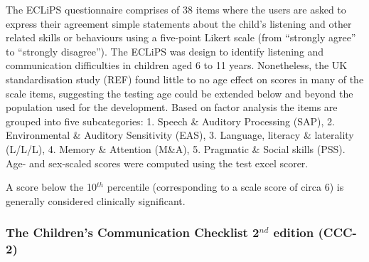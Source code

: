 \documentclass[a4paper, twoside]{templates/ociamthesis}
\begin{document}
The ECLiPS questionnaire \autocite{Barry2014} comprises of 38 items where the users are asked to express their agreement simple statements about the child's listening and other related skills or behaviours using a five-point Likert scale (from ``strongly agree'' to ``strongly disagree''). The ECLiPS was design to identify listening and communication difficulties in children aged 6 to 11 years. Nonetheless, the UK standardisation study (REF) found little to no age effect on scores in many of the scale items, suggesting the testing age could be extended below and beyond the population used for the development. Based on factor analysis the items are grouped into five subcategories: 1. Speech \& Auditory Processing (SAP), 2. Environmental \& Auditory Sensitivity (EAS), 3. Language, literacy \& laterality (L/L/L), 4. Memory \& Attention (M\&A), 5. Pragmatic \& Social skills (PSS). Age- and sex-scaled scores were computed using the test excel scorer.

A score below the 10\(^{th}\) percentile (corresponding to a scale score of circa 6) is generally considered clinically significant.

\hypertarget{the-childrens-communication-checklist-2nd-edition-ccc-2}{%
\subsubsection*{\texorpdfstring{The Children's Communication Checklist 2\(^{nd}\) edition (CCC-2)}{The Children's Communication Checklist 2\^{}\{nd\} edition (CCC-2)}}\label{the-childrens-communication-checklist-2nd-edition-ccc-2}}
\end{document}

